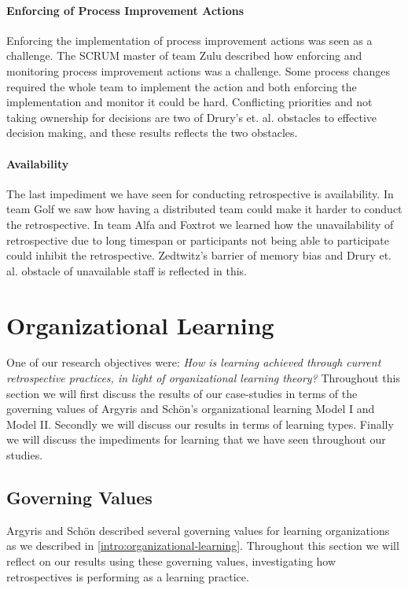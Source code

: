 \paragraph{Enforcing of Process Improvement Actions}
Enforcing the implementation of process improvement actions was seen as a challenge. The SCRUM master of team Zulu described how enforcing and monitoring process improvement actions was a challenge. Some process changes required the whole team to implement the action and both enforcing the implementation and monitor it could be hard. Conflicting priorities and not taking ownership for decisions are two of Drury's et. al. \cite{Drury2012} obstacles to effective decision making, and these results reflects the two obstacles. 

\paragraph{Availability}
The last impediment we have seen for conducting retrospective is availability. In team Golf we saw how having a distributed team could make it harder to conduct the retrospective. In team Alfa and Foxtrot we learned how the unavailability of retrospective due to long timespan or participants not being able to participate could inhibit the retrospective. Zedtwitz's \cite{Zedtwitz2002} barrier of memory bias and Drury et. al. \cite{Drury2012} obstacle of unavailable staff is reflected in this. 

\clearpage

\section{Organizational Learning} %
One of our research objectives were: \textit{How is learning achieved through current retrospective practices, in light of organizational learning theory?} Throughout this section we will first discuss the results of our case-studies in terms of the governing values of Argyris and Schön's \cite{Argyris1996} organizational learning Model I and Model II. Secondly we will discuss our results in terms of learning types. Finally we will discuss the impediments for learning that we have seen throughout our studies. 

\label{sec:organizational_learning}
\subsection{Governing Values}
Argyris and Schön\cite{Argyris1996} described several governing values for learning organizations as we described in \autoref{intro:organizational-learning}. Throughout this section we will reflect on our results using these governing values, investigating how retrospectives is performing as a learning practice. 

